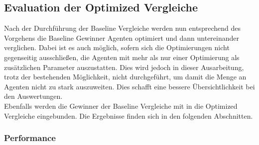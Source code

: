 \subsection{Evaluation der Optimized Vergleiche}
Nach der Durchführung der Baseline Vergleiche werden nun entsprechend des Vorgehens  die Baseline Gewinner Agenten  optimiert und dann untereinander verglichen.
Dabei ist es auch möglich, sofern sich die Optimierungen nicht gegenseitig ausschließen, die Agenten mit mehr als nur einer Optimierung als zusätzlichen Parameter auszustatten. Dies wird jedoch in dieser Ausarbeitung, trotz der bestehenden Möglichkeit, nicht durchgeführt, um damit die Menge an Agenten nicht zu stark auszuweiten. Dies schafft eine bessere Übersichtlichkeit bei den Auswertungen.\\
Ebenfalls werden die Gewinner der Baseline Vergleiche mit in die Optimized Vergleiche eingebunden. Die Ergebnisse finden sich in den folgenden Abschnitten.

\subsubsection{Performance} \label{sec:Evaluation_Performance_Optimized}

